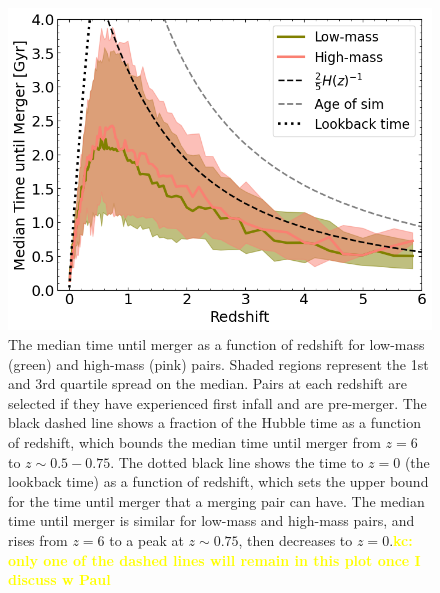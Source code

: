 \documentclass[twocolumn,linenumbers]{aastex631}
\newcommand{\kc}[1]{\textcolor{yellow}{\textbf{kc: #1}} }
\begin{document}
    \begin{figure}[htb]
        \centering
        \includegraphics[width=\columnwidth]{plots/bet-on-it/8_timescale_mod.png}
        \caption{The median time until merger as a function of redshift for low-mass (green) and high-mass (pink) pairs. Shaded regions represent the 1st and 3rd quartile spread on the median. Pairs at each redshift are selected if they have experienced first infall and are pre-merger. 
        The black dashed line shows a fraction of the Hubble time as a function of redshift, which bounds the median time until merger from $z=6$ to $z\sim0.5-0.75$.
        The dotted black line shows the time to $z=0$ (the lookback time) as a function of redshift, which sets the upper bound for the time until merger that a merging pair can have. 
        The median time until merger is similar for low-mass and high-mass pairs, and rises from $z=6$ to a peak at $z\sim0.75$, then decreases to $z=0$.\kc{only one of the dashed lines will remain in this plot once I discuss w Paul}}
        \label{fig:timescales}
    \end{figure}
    
\end{document}
